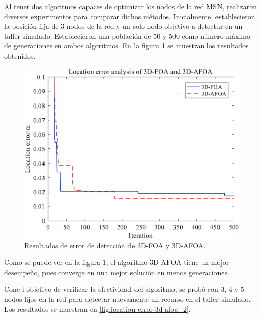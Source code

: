   Al tener dos algoritmos capaces de optimizar los nodos de la red MSN,
  realizaron diversos experimentos para comparar dichos métodos. Inicialmente,
  establecieron la posición fija de 3 nodos de la red y un solo nodo objetivo
  a detectar en un taller simulado. Establecieron una población de 50 y 500
  como número máximo de generaciones en ambos algoritmos. En la figura
  \ref{fig:location-error-3d-foa-3d-afoa_1} se muestran los resultados
  obtenidos.

  \begin{figure}[ht!]
    \includegraphics[width=\textwidth]{location-error-3d-foa-3d-afoa_1.png}
    \centering
    \caption{Resultados de error de detección de 3D-FOA y 3D-AFOA.}
    \label{fig:location-error-3d-foa-3d-afoa_1}
    \centering
  \end{figure}

  Como se puede ver en la figura \ref{fig:location-error-3d-foa-3d-afoa_1}, el
  algoritmo 3D-AFOA tiene un mejor desempeño, pues converge en una mejor
  solución en menos generaciones. 

  Cone l objetivo de verificar la efectividad del algoritmo, se probó con 3, 4
  y 5 nodos fijos en la red para detectar nuevamente un recurso en el taller
  simulado. Los resultados se muestran en \ref{fig:location-error-3d-afoa_2}.

